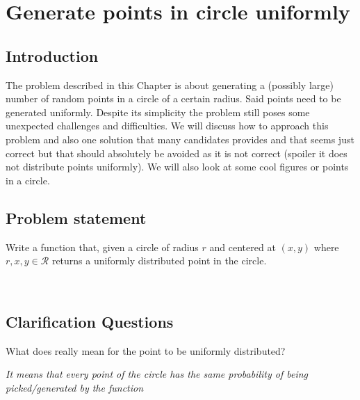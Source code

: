 %

\chapter{Generate points in circle uniformly}
\label{ch:random_points_in_circle}
\section*{Introduction}
The problem described in this Chapter is about generating a (possibly large) number of random points in a circle of a certain radius. Said points need to be generated uniformly. Despite its simplicity the problem still poses some unexpected challenges and difficulties. We will discuss how to approach this problem and also one solution that many candidates provides and that seems just correct but that should absolutely be avoided as it is not correct (spoiler it does not distribute points uniformly). We will also look at some cool figures or points in a circle.

\section{Problem statement}
\begin{exercise}
Write a function that, given a circle of radius $r$ and centered at $(x,y)$ where $r,x,y \in \mathcal{R}$ returns a uniformly distributed point in the circle.
\end{exercise}



\begin{example}
	\hfill \\

	
\end{example}

\section{Clarification Questions}

\begin{QandA}
	\item \begin{questionitem} \begin{question} What does really mean for the point to be uniformly distributed?  \end{question} 	 
    \begin{answered}
		\textit{It means that every point of the circle has the same probability of being picked/generated by the function}
	\end{answered} \end{questionitem}
\end{QandA}

